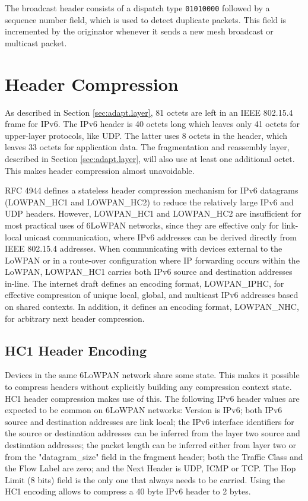 \documentclass[12pt, titlepage, a4paper]{report}
\begin{document}
The broadcast header consists of a dispatch type \texttt{01010000} followed by a sequence number field, which is used to detect duplicate packets.
This field is incremented by the originator whenever it sends a new mesh broadcast or multicast packet.

\section{Header Compression}\label{sec:hc}
As described in Section \ref{sec:adapt.layer}, 81 octets are left in an IEEE 802.15.4 frame for IPv6. The IPv6 header is 40 octets long which leaves only 41 octets for upper-layer protocols, like UDP.  The latter uses 8 octets in the header, which leaves 33 octets for application data.
The fragmentation and reassembly layer, described in Section \ref{sec:adapt.layer}, will also use at least one additional octet. This makes header compression almost unavoidable.

RFC 4944 \cite{rfc4944} defines a stateless header compression mechanism for IPv6 datagrams (LOWPAN\_HC1 and LOWPAN\_HC2) to reduce the relatively large IPv6 and UDP headers. However, LOWPAN\_HC1 and LOWPAN\_HC2 are insufficient for most practical uses of 6LoWPAN networks, since they are effective only for link-local unicast communication, where IPv6 addresses can be derived directly from IEEE 802.15.4 addresses. When communicating with devices external to the LoWPAN or in a route-over configuration where IP forwarding occurs within the LoWPAN, LOWPAN\_HC1 carries both IPv6 source and destination addresses in-line. The internet draft \cite{draft-hc-06} defines an encoding format, LOWPAN\_IPHC, for effective compression of unique local, global, and multicast IPv6 addresses based on shared contexts. In addition, it defines an encoding format, LOWPAN\_NHC, for arbitrary next header compression.

\subsection{HC1 Header Encoding}

Devices in the same 6LoWPAN network share some state.  This makes it possible to compress headers without explicitly building any compression context state.  HC1 header compression makes use of this. The following IPv6 header values are expected to be common on 6LoWPAN networks: Version is IPv6; both IPv6 source and destination addresses are link local;  the IPv6 interface identifiers for the source or destination addresses can be inferred from the layer two source and destination addresses; the packet length can be inferred either from layer two or from the "datagram\_size" field in the fragment header; both the Traffic Class and the Flow Label are zero; and the Next Header is UDP, ICMP or TCP. The Hop Limit (8 bits) field is the only one that always needs to be carried. Using the HC1 encoding allows to compress a 40 byte IPv6 header to 2 bytes.
\end{document}
